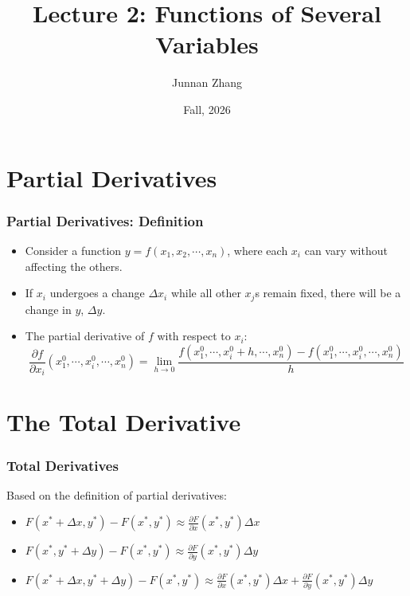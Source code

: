 \documentclass[9pt,aspectratio=169]{beamer}
\title[Lecture 2: Functions of Several Variables]{Lecture 2: Functions of
  Several Variables}
\author{Junnan Zhang} %
\institute[Paula and Gregory Chow Institute for Studies in Economics\\
Xiamen University] %
{
	Paula and Gregory Chow Institute for Studies in Economics \\ Xiamen University  \\ %
	\medskip
}
\date{Fall, 2026} %
\begin{document}
\begin{frame}
\titlepage %
\end{frame}
%
 




\section{Partial Derivatives}
\begin{frame}
	\frametitle{Partial Derivatives: Definition}
	\begin{itemize} 
		\item Consider a function $y = f(x_1,x_2,\cdots,x_n)$, where each $x_i$ can vary without affecting the others. 
		\item If $x_i$ undergoes a change $\Delta x_i$ while all other $x_j$s
        remain fixed, there will be a change in $y$, $\Delta y$.
		\item The partial derivative of $f$ with respect to $x_i$: 
		\small
		\begin{equation*}
            \frac{\partial f}{\partial x_i}(x_1^0,\cdots,x_i^0,\cdots,x_n^0)
            =\lim_{h\rightarrow
              0}\frac{f(x_1^0,\cdots,x_i^0+h,\cdots,x_n^0)-f(x_1^0,\cdots,x_i^0,\cdots,x_n^0)}{h}
		\end{equation*}
	\end{itemize}
\end{frame}

\section{The Total Derivative}
\begin{frame}
	\frametitle{Total Derivatives}
	Based on the definition of partial derivatives:
	\begin{itemize}
		\item $F(x^*+\Delta x,y^*)-F(x^*,y^*) \approx \frac{\partial F}{\partial x}(x^*,y^*)\Delta x$  
		\item  $F(x^*,y^*+\Delta y)-F(x^*,y^*) \approx \frac{\partial F}{\partial y}(x^*,y^*)\Delta y$  
		\item $F(x^*+\Delta x,y^*+\Delta y)-F(x^*,y^*) \approx \frac{\partial F}{\partial x}(x^*,y^*)\Delta x + \frac{\partial F}{\partial y}(x^*,y^*)\Delta y$
	\end{itemize}
\end{frame}		
\end{document}
